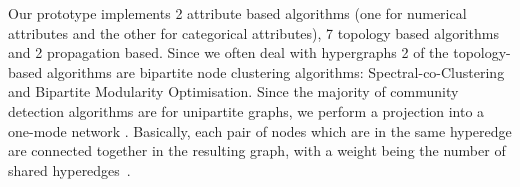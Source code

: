 







Our prototype implements 2 attribute based algorithms (one for numerical attributes and the other for categorical attributes), 7 topology based algorithms and 2 propagation based. Since we often deal with hypergraphs 2 of the topology-based algorithms are bipartite node clustering algorithms: Spectral-co-Clustering \cite{coClustering} and Bipartite Modularity Optimisation. Since the majority of community detection algorithms are for unipartite graphs, we perform a projection into a one-mode network \cite{bipartiteProjection}. Basically, each pair of nodes which are in the same hyperedge are connected together in the resulting graph, with a weight being the number of shared hyperedges~\cite{guimera2007module}.

